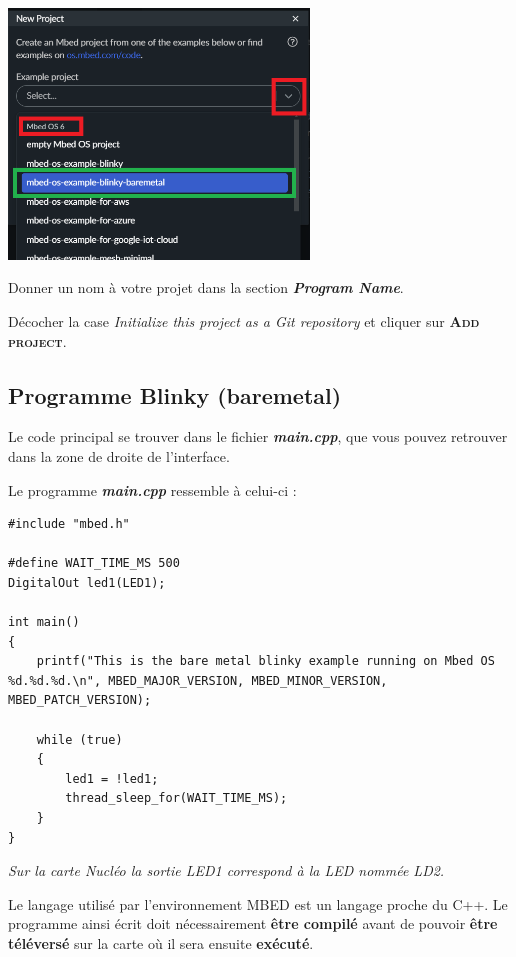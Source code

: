 \documentclass[a4paper,11pt,titlepage]{article} %
\begin{document}
\begin{center}
	\includegraphics[width=0.6\textwidth]{images/keil_cloud_new_project_mbed_blinky.png}
\end{center}

Donner un nom à votre projet dans la section \textsl{\textbf{Program Name}}.

Décocher la case \textit{Initialize this project as a Git repository} et cliquer sur \textsc{\textbf{Add project}}. 


\newpage
\subsection{Programme Blinky (baremetal)}

Le code principal se trouver dans le fichier \textsl{\textbf{main.cpp}}, que vous pouvez retrouver dans la zone de droite de l'interface.

Le programme \textsl{\textbf{main.cpp}} ressemble à celui-ci :

\begin{lstlisting}
#include "mbed.h"

#define WAIT_TIME_MS 500 
DigitalOut led1(LED1);

int main()
{
    printf("This is the bare metal blinky example running on Mbed OS %d.%d.%d.\n", MBED_MAJOR_VERSION, MBED_MINOR_VERSION, MBED_PATCH_VERSION);

    while (true)
    {
        led1 = !led1;
        thread_sleep_for(WAIT_TIME_MS);
    }
}

\end{lstlisting}

\textit{Sur la carte Nucléo la sortie LED1 correspond à la LED nommée LD2.}

Le langage utilisé par l'environnement MBED est un langage proche du C++. Le programme ainsi écrit doit nécessairement \textbf{être compilé} avant de pouvoir \textbf{être téléversé} sur la carte où il sera ensuite \textbf{exécuté}.
\end{document}
